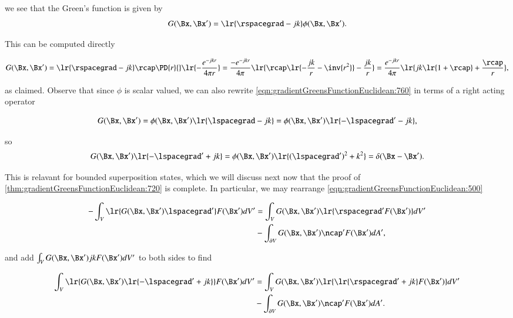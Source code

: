 we see that the Green's function is given by
\begin{dmath}\label{eqn:gradientGreensFunctionEuclidean:760}
G(\Bx, \Bx')
=
\lr{ \rspacegrad - j k } \phi(\Bx, \Bx').
\end{dmath}

This can be computed directly

\begin{dmath}\label{eqn:gradientGreensFunctionEuclidean:780}
G(\Bx, \Bx')
=
\lr{ \rspacegrad - j k } \rcap \PD{r}{} \lr{ -\frac{e^{-j k r}}{4 \pi r} }
=
\frac{-e^{-j k r}}{4 \pi}
\lr{
\rcap \lr{ -\frac{j k}{r} - \inv{ r^2 } } - \frac{j k}{r}
}
=
\frac{e^{-j k r}}{4 \pi}
\lr{
j k \lr{ 1 + \rcap } + \frac{\rcap}{r}
},
\end{dmath}

as claimed.
Observe that since \( \phi \) is scalar valued, we can also rewrite
\cref{eqn:gradientGreensFunctionEuclidean:760} in terms of a right acting operator

\begin{dmath}\label{eqn:gradientGreensFunctionEuclidean:800}
G(\Bx, \Bx')
=
\phi(\Bx, \Bx')
\lr{ \lspacegrad - j k }
=
\phi(\Bx, \Bx')
\lr{ -\lspacegrad' - j k },
\end{dmath}

so
\begin{equation}\label{eqn:gradientGreensFunctionEuclidean:820}
G(\Bx, \Bx') \lr{ -\lspacegrad' + j k } =
\phi(\Bx, \Bx') \lr{ (\lspacegrad')^2 + k^2 }
=
\delta(\Bx - \Bx').
\end{equation}

This is relavant for bounded superposition states, which we will discuss next now that the proof of
\cref{thm:gradientGreensFunctionEuclidean:720} is complete.  In particular, we may rearrange
\cref{eqn:gradientGreensFunctionEuclidean:500}

\begin{dmath}\label{eqn:gradientGreensFunctionEuclidean:840}
\begin{aligned}
-\int_V \lr{ G(\Bx, \Bx') \lspacegrad'} F(\Bx') dV'
&=
\int_V G(\Bx, \Bx') \lr{ \rspacegrad' F(\Bx')} dV' \\
&-
\int_{\partial V} G(\Bx, \Bx') \ncap' F(\Bx') dA',
\end{aligned}
\end{dmath}

and add \( \int_V G(\Bx, \Bx') j k F(\Bx') dV' \) to both sides to find

\begin{dmath}\label{eqn:gradientGreensFunctionEuclidean:860}
\begin{aligned}
\int_V \lr{ G(\Bx, \Bx') \lr{ -\lspacegrad' + j k } } F(\Bx') dV'
&=
\int_V G(\Bx, \Bx') \lr{ \lr{ \rspacegrad' + j k } F(\Bx') } dV' \\
&-
\int_{\partial V} G(\Bx, \Bx') \ncap' F(\Bx') dA'.
\end{aligned}
\end{dmath}

